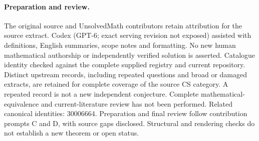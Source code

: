 \documentclass[11pt]{article}
\begin{document}
\paragraph{Preparation and review.}
The original source and UnsolvedMath contributors retain attribution for the source extract. Codex (GPT-6; exact serving revision not exposed) assisted with definitions, English summaries, scope notes and formatting. No new human mathematical authorship or independently verified solution is asserted. Catalogue identity checked against the complete supplied registry and current repository. Distinct upstream records, including repeated questions and broad or damaged extracts, are retained for complete coverage of the source CS category. A repeated record is not a new independent conjecture. Complete mathematical-equivalence and current-literature review has not been performed. Related canonical identities: 30006664. Preparation and final review follow contribution prompts C and D, with source gaps disclosed. Structural and rendering checks do not establish a new theorem or open status.
\label{end:statement}
\end{document}
